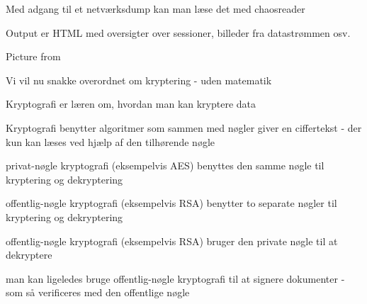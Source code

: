 \documentclass[20pt,landscape,a4paper,footrule]{foils}
\begin{document}

\begin{list1}
\item Med adgang til et netværksdump kan man læse det med chaosreader
\item Output er HTML med oversigter over sessioner, billeder fra datastrømmen osv.
\item {}

\end{list1}



Picture from 



Vi vil nu snakke overordnet om kryptering - uden matematik \smiley



\begin{list1}
\item Kryptografi er læren om, hvordan man kan kryptere data
\item Kryptografi benytter algoritmer som sammen med nøgler giver en
  ciffertekst - der kun kan læses ved hjælp af den tilhørende nøgle
\end{list1}



\begin{list1}
\item privat-nøgle kryptografi (eksempelvis AES) benyttes den samme
  nøgle til kryptering og dekryptering 
\item offentlig-nøgle kryptografi (eksempelvis RSA) benytter to
  separate nøgler til kryptering og dekryptering
\end{list1}



\begin{list1}
\item offentlig-nøgle kryptografi (eksempelvis RSA) bruger den private
  nøgle til at dekryptere
\item man kan ligeledes bruge offentlig-nøgle kryptografi til at
  signere dokumenter - som så verificeres med den offentlige nøgle
\end{list1}
\end{document}
